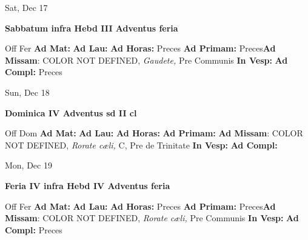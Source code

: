 \documentclass[10pt]{memoir}
\begin{document}
\begin{center}
\begin{minipage}{3.5in}
\vspace{2em}
\begin{center}Sat, Dec 17
\end{center}
\textbf{ \large Sabbatum infra Hebd III Adventus
\textnormal{\normalsize feria}}

\begin{justify}Off Fer
\textbf{Ad Mat: }
\textbf{Ad Lau: }
\textbf{Ad Horas: }Preces
\textbf{Ad Primam: }Preces\textbf{Ad Missam}: COLOR NOT DEFINED, \textit{Gaudete,} Pre Communis
\textbf{In Vesp: }
\textbf{Ad Compl: }Preces
\end{justify}
\end{minipage}
\end{center}

\begin{center}
\begin{minipage}{3.5in}
\vspace{2em}
\begin{center}Sun, Dec 18
\end{center}
\textbf{ \large Dominica IV Adventus
\textnormal{\normalsize sd II cl}}

\begin{justify}Off Dom
\textbf{Ad Mat: }
\textbf{Ad Lau: }
\textbf{Ad Horas: }
\textbf{Ad Primam: }\textbf{Ad Missam}: COLOR NOT DEFINED, \textit{Rorate cæli,} C, Pre de Trinitate
\textbf{In Vesp: }
\textbf{Ad Compl: }
\end{justify}
\end{minipage}
\end{center}

\begin{center}
\begin{minipage}{3.5in}
\vspace{2em}
\begin{center}Mon, Dec 19
\end{center}
\textbf{ \large Feria IV infra Hebd IV Adventus
\textnormal{\normalsize feria}}

\begin{justify}Off Fer
\textbf{Ad Mat: }
\textbf{Ad Lau: }
\textbf{Ad Horas: }Preces
\textbf{Ad Primam: }Preces\textbf{Ad Missam}: COLOR NOT DEFINED, \textit{Rorate cæli,} Pre Communis
\textbf{In Vesp: }
\textbf{Ad Compl: }Preces
\end{justify}
\end{minipage}
\end{center}
\end{document}
